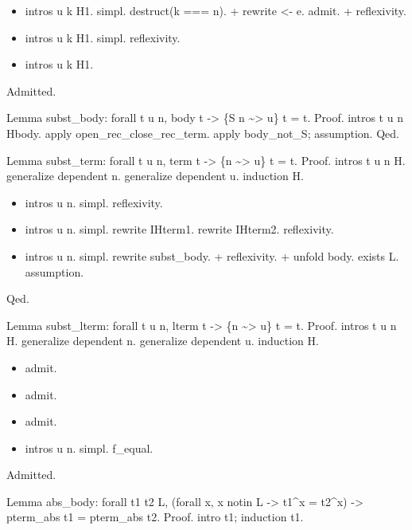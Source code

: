 \begin{itemize}
\item  intros u k H1.
    simpl.
    destruct(k === n).
    + rewrite <- e.
      admit.
    + reflexivity.

\item  intros u k H1.
    simpl.
    reflexivity.

\item  intros u k H1.

\end{itemize}
Admitted.


Lemma subst\_body: forall t u n, body t -> \{S n \~{}> u\} t = t.
Proof.
  intros t u n Hbody.
  apply open\_rec\_close\_rec\_term.
  apply body\_not\_S; assumption.
Qed.  
  

Lemma subst\_term: forall t u n, term t -> \{n \~{}> u\} t = t.
Proof.
  intros t u n H.
  generalize dependent n.
  generalize dependent u.
  induction H.

\begin{itemize}
\item  intros u n.
    simpl.
    reflexivity.

\item  intros u n.
    simpl.
    rewrite IHterm1.
    rewrite IHterm2.
    reflexivity.

\item  intros u n.
    simpl.
    rewrite subst\_body.
    + reflexivity.
    + unfold body.
      exists L.
      assumption.

\end{itemize}
Qed.


Lemma subst\_lterm: forall t u n, lterm t -> \{n \~{}> u\} t = t.
Proof.
  intros t u n H.
  generalize dependent n.
  generalize dependent u.
  induction H.

\begin{itemize}
\item  admit.

\item  admit.

\item  admit.

\item  intros u n.
    simpl.
    f\_equal.

\end{itemize}
Admitted.


Lemma abs\_body: forall t1 t2 L, (forall x, x notin L -> t1\^{}x = t2\^{}x) -> pterm\_abs t1 = pterm\_abs t2.
Proof.
  intro t1; induction t1.

